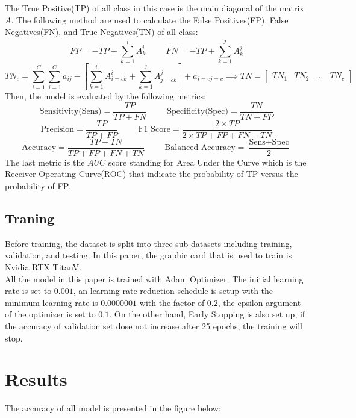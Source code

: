 \documentclass[sensors,article,submit,pdftex,moreauthors]{Definitions/mdpi}
\begin{document}
The True Positive(TP) of all class in this case is the main diagonal of the matrix $A$. The following method are used to calculate the False Positives(FP), False Negatives(FN), and True Negatives(TN) of all class:
\[
FP = -TP + \sum_{k=1}^{i}A^i_k \hspace{1cm} FN = -TP + \sum_{k=1}^{j}A^j_k
\]
\[
TN_c = \sum_{i=1}^{C}\sum_{j=1}^{C}a_{ij} - \left[ \sum_{k=1}^{i}A^i_{i=c k} + \sum_{k=1}^{j}A^j_{j=c k} \right] + a_{i=c j=c} \implies TN = \begin{bmatrix}
	TN_1 & TN_2 & \dots & TN_c
\end{bmatrix}
\]
Then, the model is evaluated by the following metrics:
\[\text{Sensitivity(Sens)} = \frac{TP}{TP + FN} \hspace{1cm} \text{Specificity(Spec)} = \frac{TN}{TN + FP}\]
\[\text{Precision} = \frac{TP}{TP + FP} \hspace{1cm} \text{F1 Score} = \frac{2 \times TP}{2 \times TP + FP + FN + TN}\]
\[\text{Accuracy} = \frac{TP + TN}{TP + FP + FN + TN} \hspace{1cm} \text{Balanced Accuracy} = \frac{\text{Sens} + \text{Spec}}{2}\]
The last metric is the $AUC$ score standing for Area Under the Curve which is the Receiver Operating Curve(ROC) that indicate the probability of TP versus the probability of FP.  
\subsection{Traning}
Before training, the dataset is split into three sub datasets including training, validation, and testing. In this paper, the graphic card that is used to train is Nvidia RTX TitanV.\\
All the model in this paper is trained with Adam Optimizer\cite{6980}. The initial learning rate is set to $0.001$, an learning rate reduction schedule is setup with the minimum learning rate is $0.0000001$ with the factor of $0.2$, the epsilon argument of the optimizer is set to $0.1$. On the other hand, Early Stopping is also set up, if the accuracy of validation set dose not increase after 25 epochs, the training will stop. 

\section{Results}
The accuracy of all model is presented in the figure below:
\end{document}
